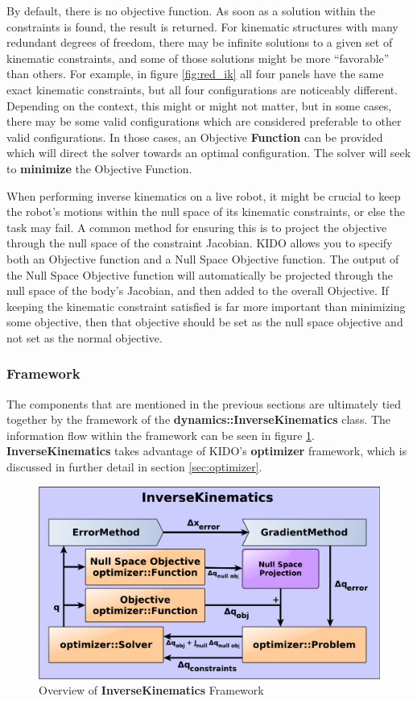 By default, there is no objective function. As soon as a solution within the constraints is found, the result is returned. For kinematic structures with many redundant degrees of freedom, there may be infinite solutions to a given set of kinematic constraints, and some of those solutions might be more ``favorable'' than others. For example, in figure \ref{fig:red_ik} all four panels have the same exact kinematic constraints, but all four configurations are noticeably different. Depending on the context, this might or might not matter, but in some cases, there may be some valid configurations which are considered preferable to other valid configurations. In those cases, an Objective \textbf{Function} can be provided which will direct the solver towards an optimal configuration. The solver will seek to \textbf{minimize} the Objective Function.

When performing inverse kinematics on a live robot, it might be crucial to keep the robot's motions within the null space of its kinematic constraints, or else the task may fail. A common method for ensuring this is to project the objective through the null space of the constraint Jacobian. KIDO allows you to specify both an Objective function and a Null Space Objective function. The output of the Null Space Objective function will automatically be projected through the null space of the body's Jacobian, and then added to the overall Objective. If keeping the kinematic constraint satisfied is far more important than minimizing some objective, then that objective should be set as the null space objective and not set as the normal objective.

\subsubsection{Framework}

The components that are mentioned in the previous sections are ultimately tied together by the framework of the \textbf{dynamics::InverseKinematics} class. The information flow within the framework can be seen in figure \ref{fig:ik_framework}. \textbf{InverseKinematics} takes advantage of KIDO's \textbf{optimizer} framework, which is discussed in further detail in section \ref{sec:optimizer}.

\begin{figure}
\centering
\includegraphics[width=\textwidth]{fig/ik_diagram.pdf}
\caption{Overview of \textbf{InverseKinematics} Framework}
\label{fig:ik_framework}
\end{figure}

